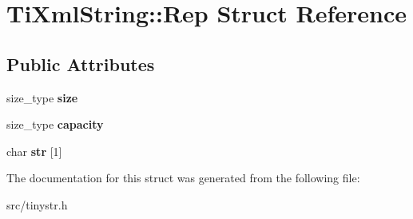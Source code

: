 \hypertarget{structTiXmlString_1_1Rep}{
\section{\-Ti\-Xml\-String\-:\-:\-Rep \-Struct \-Reference}
\label{da/d0f/structTiXmlString_1_1Rep}
}
\subsection*{\-Public \-Attributes}
\begin{DoxyCompactItemize}
\item 
\hypertarget{structTiXmlString_1_1Rep_a3470330fe806a575dbb5909a1b908ac1}{
size\-\_\-type {\bfseries size}}
\label{da/d0f/structTiXmlString_1_1Rep_a3470330fe806a575dbb5909a1b908ac1}

\item 
\hypertarget{structTiXmlString_1_1Rep_a9f38da318212f4a2f6ebe0afdbfaf477}{
size\-\_\-type {\bfseries capacity}}
\label{da/d0f/structTiXmlString_1_1Rep_a9f38da318212f4a2f6ebe0afdbfaf477}

\item 
\hypertarget{structTiXmlString_1_1Rep_a88a7037a489827ec9e59b008e11342b0}{
char {\bfseries str} \mbox{[}1\mbox{]}}
\label{da/d0f/structTiXmlString_1_1Rep_a88a7037a489827ec9e59b008e11342b0}

\end{DoxyCompactItemize}


\-The documentation for this struct was generated from the following file\-:\begin{DoxyCompactItemize}
\item 
src/tinystr.\-h\end{DoxyCompactItemize}
